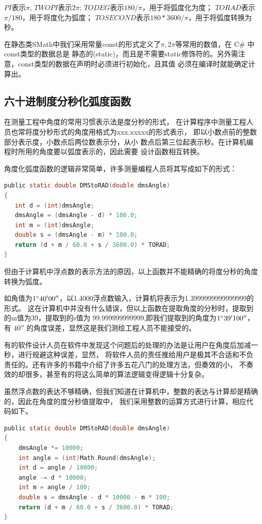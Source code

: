 $PI$表示$\pi$, $TWOPI$表示$2\pi$;
$TODEG$表示$180/\pi$，用于将弧度化为度；
$TORAD$表示$\pi/180$，用于将度化为弧度；
$TOSECOND$表示$180*3600/\pi$，用于将弧度转换为秒。

在静态类SMath中我们采用常量const的形式定义了$\pi, 2\pi$等常用的数值，在 C\# 中 const类型的数据总是
静态的(static)，而且是不需要static修饰符的。另外需注意，const类型的数据在声明时必须进行初始化，且其值
必须在编译时就能确定计算出。

\subsection{六十进制度分秒化弧度函数}

 在测量工程中角度的常用习惯表示法是度分秒的形式，
 在计算程序中测量工程人员也常将度分秒形式的角度用格式为xxx.xxxxx的形式表示，
 即以小数点前的整数部分表示度，小数点后两位数表示分，从小
 数点后第三位起表示秒。在计算机编程时所用的角度要以弧度表示的，因此需要
 设计函数相互转换。

 
角度化弧度函数的逻辑非常简单，许多测量编程人员将其写成如下的形式：

\begin{lstlisting}[language=C]
public static double DMStoRAD(double dmsAngle)
{
   int d = (int)dmsAngle;
   dmsAngle = (dmsAngle - d) * 100.0;
   int m = (int)dmsAngle;
   double s = (dmsAngle - m) * 100.0;
   return (d + m / 60.0 + s / 3600.0) * TORAD;
}
\end{lstlisting}

但由于计算机中浮点数的表示方法的原因，以上函数并不能精确的将度分秒的角度转换为弧度。

 如角值为$1^\circ 40'00''$，以1.4000浮点数输入，计算机将表示为1.3999999999999999的形式。
 这在计算机中并没有什么错误，但以上函数在提取角度的分秒时，提取到的m值为39，提取到的s值为
 99.999999999999,即我们提取到的角度为$1^\circ 39'100''$，有 $40''$ 的角度误差，显然这是我们测绘工程人员不能接受的。
 
 有的软件设计人员在软件中发现这个问题后的处理的办法是让用户在角度后加减一秒，进行规避这种误差，显然，
 将软件人员的责任推给用户是极其不合适和不负责任的。还有许多的书籍中介绍了许多五花八门的处理方法，但奏效的小，
 不奏效的却很多，甚至有的将这么简单的算法逻辑变得逻辑十分复杂。
 
 虽然浮点数的表达不够精确，但我们知道在计算机中，整数的表达与计算却是精确的，因此在角度的度分秒值提取中，
 我们采用整数的运算方式进行计算，相应代码如下。
 
\begin{lstlisting}[language=C]
public static double DMStoRAD(double dmsAngle)
{
    dmsAngle *= 10000; 
    int angle = (int)Math.Round(dmsAngle);
    int d = angle / 10000;
    angle -= d * 10000;
    int m = angle / 100;
    double s = dmsAngle - d * 10000 - m * 100;
    return (d + m / 60.0 + s / 3600.0) * TORAD;
}
\end{lstlisting}

